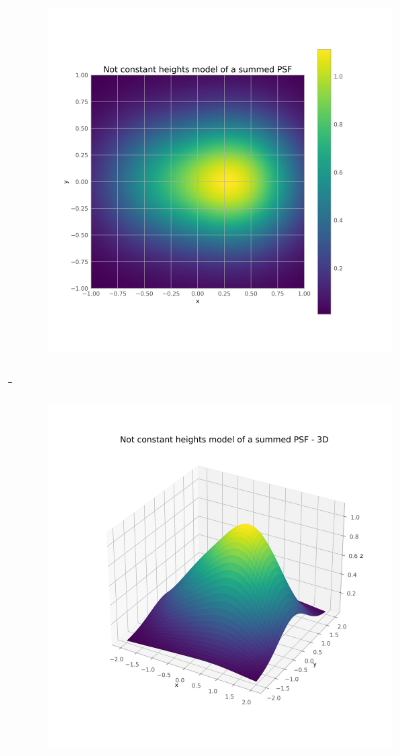 

        \begin{figure}[H]
        \centering
        \begin{subfigure}{.45\textwidth}
            \includegraphics[width=\textwidth]{report/Figures/models/model_psf_notconst.png}
        \end{subfigure}%
        \hspace{1em}-
        \begin{subfigure}{.45\textwidth}
            \centering
            \includegraphics[width=\textwidth]{report/Figures/models/model_psf_notconst_3d.png}

\end{subfigure}
\end{figure}
